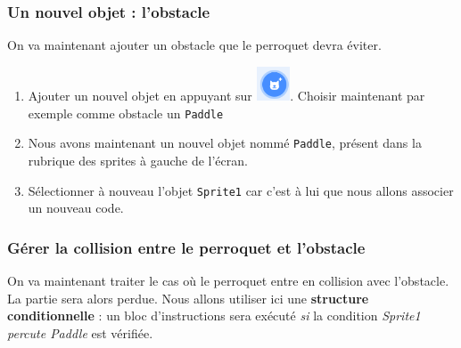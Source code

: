 


\subsubsection{Un nouvel objet : l'obstacle}       

On va maintenant ajouter un obstacle que le perroquet devra éviter.

\begin{enumerate}
\item Ajouter un nouvel objet en appuyant sur  \includegraphics[width=1cm]{./images/scratch/sprite.png}. Choisir maintenant par exemple comme obstacle un \texttt{Paddle}
\item Nous avons maintenant un nouvel objet nommé \texttt{Paddle}, présent dans la rubrique des sprites à gauche de l'écran.
\item Sélectionner à nouveau l'objet \texttt{Sprite1} car c'est à lui que nous allons associer un nouveau code.
\end{enumerate}


\subsubsection{Gérer la collision entre le perroquet et l'obstacle} 

On va maintenant traiter le cas où le perroquet entre en collision avec l'obstacle. La partie sera alors perdue. Nous allons utiliser ici une \textbf{structure conditionnelle} : un bloc d'instructions sera exécuté \emph{si} la condition \emph{Sprite1 percute Paddle} est vérifiée. 

